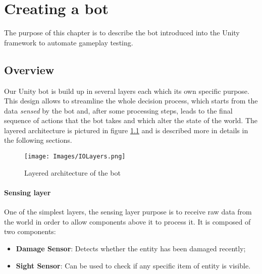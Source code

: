 \chapter{Creating a bot}
\label{ch:chapter_two}%

The purpose of this chapter is to describe the bot introduced into the Unity framework to automate gameplay testing.

\section{Overview}

Our Unity bot is build up in several layers each which its own specific purpose. This design allows to streamline the whole decision process, which starts from the data \textit{sensed} by the bot and, after some processing steps, leads to the final sequence of actions that the bot takes and which alter the state of the world.
The layered architecture is pictured in figure \ref{fig:layered_bot_architecture} and is described more in details in the following sections.


\begin{figure}[h]
    \centering
    \texttt{[image: Images/IOLayers.png]}
    \caption{Layered architecture of the bot}
    \label{fig:layered_bot_architecture}
\end{figure}

\subsubsection{Sensing layer}

One of the simplest layers, the sensing layer purpose is to receive raw data from the world in order to allow components above it to process it. 
It is composed of two components:
\begin{itemize}
    \item \textbf{Damage Sensor}: Detects whether the entity has been damaged recently;
    \item \textbf{Sight Sensor}: Can be used to check if any specific item of entity is visible.
\end{itemize}

